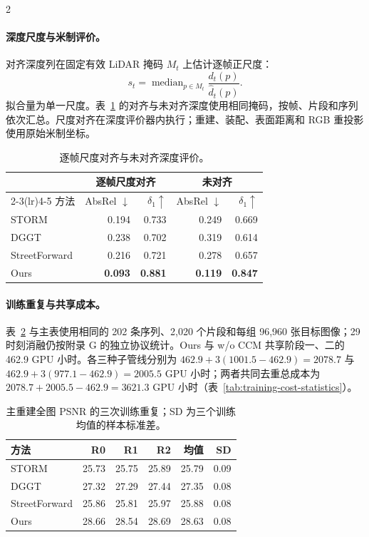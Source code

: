 \begin{multicols}{2}

\paragraph{深度尺度与米制评价。}
对齐深度列在固定有效 LiDAR 掩码 $M_t$ 上估计逐帧正尺度：
\begin{equation}
s_t=\operatorname{median}_{p\in M_t}\frac{d_t(p)}{\widehat d_t(p)}.
\label{eq:depth-alignment}
\end{equation}
拟合量为单一尺度。表~\ref{tab:depth-scale} 的对齐与未对齐深度使用相同掩码，按帧、片段和序列依次汇总。尺度对齐在深度评价器内执行；重建、装配、表面距离和 RGB 重投影使用原始米制坐标。

\begin{table}[H]
\centering\small
\caption{逐帧尺度对齐与未对齐深度评价。}
\label{tab:depth-scale}
\begin{tabular}{@{}lrrrr@{}}
\toprule
& \multicolumn{2}{c}{逐帧尺度对齐} & \multicolumn{2}{c}{未对齐} \\
\cmidrule(lr){2-3}\cmidrule(lr){4-5}
方法 & AbsRel $\downarrow$ & $\delta_1\uparrow$ & AbsRel $\downarrow$ & $\delta_1\uparrow$ \\
\midrule
STORM & 0.194 & 0.733 & 0.249 & 0.669 \\
DGGT & 0.238 & 0.702 & 0.319 & 0.614 \\
StreetForward & 0.216 & 0.721 & 0.278 & 0.657 \\
Ours & \textbf{0.093} & \textbf{0.881} & \textbf{0.119} & \textbf{0.847} \\
\bottomrule
\end{tabular}
\end{table}

\paragraph{训练重复与共享成本。}
表~\ref{tab:main-training-seeds} 与主表使用相同的 202 条序列、2,020 个片段和每组 96,960 张目标图像；29 时刻消融仍按附录 G 的独立协议统计。Ours 与 w/o CCM 共享阶段一、二的 462.9 GPU 小时。各三种子管线分别为 $462.9+3(1001.5-462.9)=2078.7$ 与 $462.9+3(977.1-462.9)=2005.5$ GPU 小时；两者共同去重总成本为 $2078.7+2005.5-462.9=3621.3$ GPU 小时（表~\ref{tab:training-cost-statistics}）。

\begin{table}[H]
\centering\small
\setlength{\tabcolsep}{4pt}
\caption{主重建全图 PSNR 的三次训练重复；SD 为三个训练均值的样本标准差。}
\label{tab:main-training-seeds}
\begin{tabular}{@{}lrrrrr@{}}
\toprule
方法 & R0 & R1 & R2 & 均值 & SD \\
\midrule
STORM & 25.73 & 25.75 & 25.89 & 25.79 & 0.09 \\
DGGT & 27.32 & 27.29 & 27.44 & 27.35 & 0.08 \\
StreetForward & 25.86 & 25.81 & 25.97 & 25.88 & 0.08 \\
Ours & 28.66 & 28.54 & 28.69 & 28.63 & 0.08 \\
\bottomrule
\end{tabular}
\end{table}


\end{multicols}
